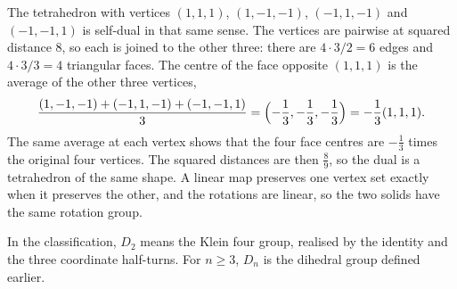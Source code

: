 The tetrahedron with vertices $(1,1,1)$, $(1,-1,-1)$, $(-1,1,-1)$ and $(-1,-1,1)$ is self-dual in that same sense. The vertices are pairwise at squared distance $8$, so each is joined to the other three: there are $4\cdot3/2=6$ edges and $4\cdot3/3=4$ triangular faces. The centre of the face opposite $(1,1,1)$ is the average of the other three vertices,
\[
\frac{(1,-1,-1)+(-1,1,-1)+(-1,-1,1)}{3}
=\Bigl(-\frac13,-\frac13,-\frac13\Bigr)
=-\frac13(1,1,1).
\]
The same average at each vertex shows that the four face centres are $-\frac13$ times the original four vertices. The squared distances are then $\frac89$, so the dual is a tetrahedron of the same shape. A linear map preserves one vertex set exactly when it preserves the other, and the rotations are linear, so the two solids have the same rotation group.

In the classification, $D_2$ means the Klein four group, realised by the
identity and the three coordinate half-turns. For $n\ge3$, $D_n$ is the
dihedral group defined earlier.

